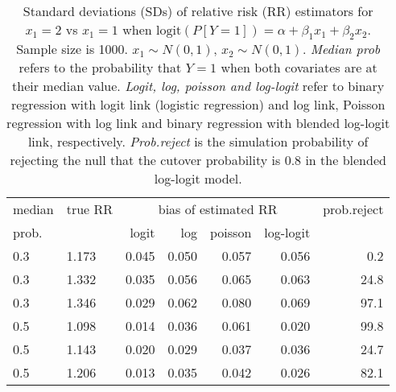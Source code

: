 \documentclass[12pt,a4paper]{article}
\begin{document}
\begin{table}[H] 
\small\sf\centering 
\caption{Standard deviations (SDs) of relative risk (RR) estimators for $x_1=2$ vs $x_1=1$ when $\mbox{logit}(P[Y=1])=\alpha+\beta_1 x_1 + \beta_2 x_2$. Sample size is 1000. $x_1 \sim $$N(0,1)$, $x_2 \sim N(0,1)$. {\it Median prob} refers to the probability that $Y=1$ when both covariates are at their median value. {\it Logit, log, poisson and log-logit} refer to binary regression with logit link (logistic regression) and log link, Poisson regression with log link and binary regression with blended log-logit link, respectively. {\it Prob.reject} is the simulation probability of rejecting the null that the cutover probability is $0.8$ in the blended log-logit model.} 
\begin{tabular}{llrrrrr} 
\toprule 
median & true RR & \multicolumn{4}{c}{bias of estimated RR} & prob.reject \\ 
prob. & & logit & log & poisson & log-logit  & \\ \midrule 
0.3 & 1.173 & 0.045 & 0.050 & 0.057 & 0.056 &  0.2 \\  
0.3 & 1.332 & 0.035 & 0.056 & 0.065 & 0.063 & 24.8 \\  
0.3 & 1.346 & 0.029 & 0.062 & 0.080 & 0.069 & 97.1 \\  
0.5 & 1.098 & 0.014 & 0.036 & 0.061 & 0.020 & 99.8 \\  
0.5 & 1.143 & 0.020 & 0.029 & 0.037 & 0.036 & 24.7 \\  
0.5 & 1.206 & 0.013 & 0.035 & 0.042 & 0.026 & 82.1 \\  
\bottomrule 
\end{tabular} 
\end{table} 
\end{document}
